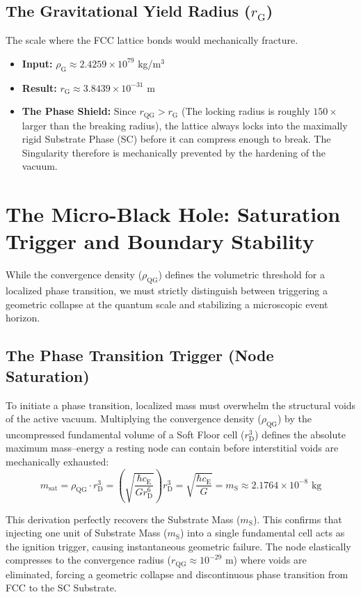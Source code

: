 \subsection{The Gravitational Yield Radius ($r_{\mathrm{G}}$)}
The scale where the FCC lattice bonds would mechanically fracture.
\begin{itemize}
    \item \textbf{Input:} $\rho_{\mathrm{G}} \approx 2.4259 \times 10^{79}$ kg/m$^3$
    \item \textbf{Result:} $r_{\mathrm{G}} \approx 3.8439 \times 10^{-31}$ m
    \item \textbf{The Phase Shield:} Since $r_{\mathrm{QG}} > r_{\mathrm{G}}$ (The locking radius is roughly $150\times$ larger than the breaking radius), the lattice always locks into the maximally rigid Substrate Phase (SC) before it can compress enough to break. The Singularity therefore is mechanically prevented by the hardening of the vacuum.
\end{itemize}

\section{The Micro-Black Hole: Saturation Trigger and Boundary Stability}
While the convergence density ($\rho_{\mathrm{QG}}$) defines the volumetric threshold for a localized phase transition, we must strictly distinguish between triggering a geometric collapse at the quantum scale and stabilizing a microscopic event horizon.

\subsection{The Phase Transition Trigger (Node Saturation)}
To initiate a phase transition, localized mass must overwhelm the structural voids of the active vacuum. Multiplying the convergence density ($\rho_{\mathrm{QG}}$) by the uncompressed fundamental volume of a Soft Floor cell ($r_{\mathrm{D}}^3$) defines the absolute maximum mass--energy a resting node can contain before interstitial voids are mechanically exhausted:
\begin{equation}
    m_{\mathrm{sat}} = \rho_{\mathrm{QG}} \cdot r_{\mathrm{D}}^3 = \left( \sqrt{\frac{\hbar c_{\mathrm{E}}}{G r_{\mathrm{D}}^6}} \right) r_{\mathrm{D}}^3 = \sqrt{\frac{\hbar c_{\mathrm{E}}}{G}} = m_{\mathrm{S}} \approx 2.1764 \times 10^{-8} \text{ kg}
\end{equation}

This derivation perfectly recovers the Substrate Mass ($m_{\mathrm{S}}$). This confirms that injecting one unit of Substrate Mass ($m_{\mathrm{S}}$) into a single fundamental cell acts as the ignition trigger, causing instantaneous geometric failure. The node elastically compresses to the convergence radius ($r_{\mathrm{QG}} \approx 10^{-29}$ m) where voids are eliminated, forcing a geometric collapse and discontinuous phase transition from FCC to the SC Substrate.

